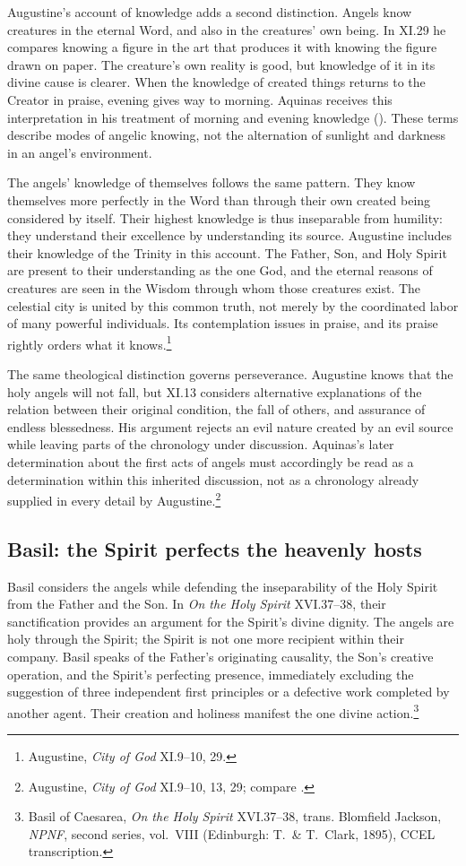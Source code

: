 Augustine's account of knowledge adds a second distinction. Angels know creatures in the eternal Word, and also in the creatures' own being. In XI.29 he compares knowing a figure in the art that produces it with knowing the figure drawn on paper. The creature's own reality is good, but knowledge of it in its divine cause is clearer. When the knowledge of created things returns to the Creator in praise, evening gives way to morning. Aquinas receives this interpretation in his treatment of morning and evening knowledge (). These terms describe modes of angelic knowing, not the alternation of sunlight and darkness in an angel's environment.


The angels' knowledge of themselves follows the same pattern. They know themselves more perfectly in the Word than through their own created being considered by itself. Their highest knowledge is thus inseparable from humility: they understand their excellence by understanding its source. Augustine includes their knowledge of the Trinity in this account. The Father, Son, and Holy Spirit are present to their understanding as the one God, and the eternal reasons of creatures are seen in the Wisdom through whom those creatures exist. The celestial city is united by this common truth, not merely by the coordinated labor of many powerful individuals. Its contemplation issues in praise, and its praise rightly orders what it knows.\footnote{Augustine, \emph{City of God} XI.9--10, 29.}

The same theological distinction governs perseverance. Augustine knows that the holy angels will not fall, but XI.13 considers alternative explanations of the relation between their original condition, the fall of others, and assurance of endless blessedness. His argument rejects an evil nature created by an evil source while leaving parts of the chronology under discussion. Aquinas's later determination about the first acts of angels must accordingly be read as a determination within this inherited discussion, not as a chronology already supplied in every detail by Augustine.\footnote{Augustine, \emph{City of God} XI.9--10, 13, 29; compare .}

\subsection{Basil: the Spirit perfects the heavenly hosts}

Basil considers the angels while defending the inseparability of the Holy Spirit from the Father and the Son. In \emph{On the Holy Spirit} XVI.37--38, their sanctification provides an argument for the Spirit's divine dignity. The angels are holy through the Spirit; the Spirit is not one more recipient within their company. Basil speaks of the Father's originating causality, the Son's creative operation, and the Spirit's perfecting presence, immediately excluding the suggestion of three independent first principles or a defective work completed by another agent. Their creation and holiness manifest the one divine action.\footnote{Basil of Caesarea, \emph{On the Holy Spirit} XVI.37--38, trans. Blomfield Jackson, \emph{NPNF}, second series, vol.~VIII (Edinburgh: T.~\& T.~Clark, 1895), CCEL transcription.}

